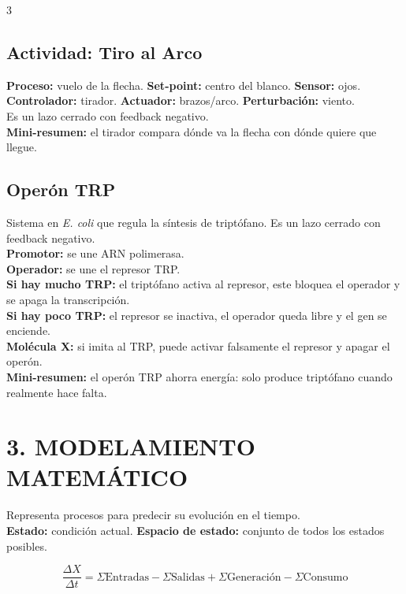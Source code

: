 \documentclass[9pt,landscape,letterpaper]{extarticle}
\begin{document}
\begin{multicols*}{3}
	\subsection{Actividad: Tiro al Arco}
	\textbf{Proceso:} vuelo de la flecha. \textbf{Set-point:} centro del blanco. \textbf{Sensor:} ojos. \textbf{Controlador:} tirador. \textbf{Actuador:} brazos/arco. \textbf{Perturbación:} viento.\\
	Es un lazo cerrado con feedback negativo.\\
	\textbf{Mini-resumen:} el tirador compara dónde va la flecha con dónde quiere que llegue.

	\subsection{Operón TRP}
	Sistema en \textit{E. coli} que regula la síntesis de triptófano. Es un lazo cerrado con feedback negativo.\\
	\textbf{Promotor:} se une ARN polimerasa.\\
	\textbf{Operador:} se une el represor TRP.\\
	\textbf{Si hay mucho TRP:} el triptófano activa al represor, este bloquea el operador y se apaga la transcripción.\\
	\textbf{Si hay poco TRP:} el represor se inactiva, el operador queda libre y el gen se enciende.\\
	\textbf{Molécula X:} si imita al TRP, puede activar falsamente el represor y apagar el operón.\\
	\textbf{Mini-resumen:} el operón TRP ahorra energía: solo produce triptófano cuando realmente hace falta.

	\section{3. MODELAMIENTO MATEMÁTICO}
	Representa procesos para predecir su evolución en el tiempo.\\
	\textbf{Estado:} condición actual. \textbf{Espacio de estado:} conjunto de todos los estados posibles.

	\begin{tcolorbox}[colback=boxbg,colframe=myblue,boxrule=0.5pt,arc=2pt]
		\[
			\frac{\Delta X}{\Delta t}=\Sigma \text{Entradas}-\Sigma \text{Salidas}+\Sigma \text{Generación}-\Sigma \text{Consumo}
		\]
	\end{tcolorbox}


\end{multicols*}
\end{document}
